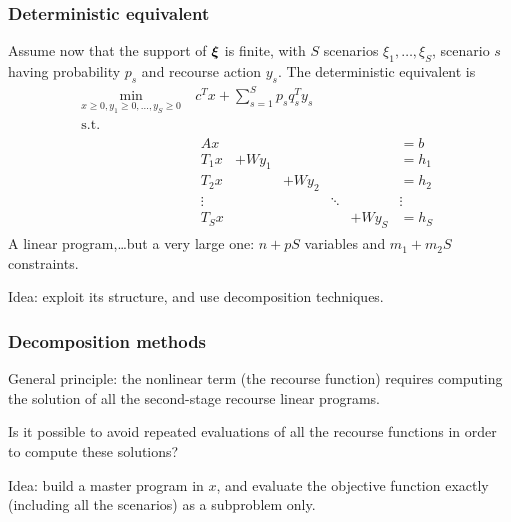 \documentclass[aspectratio=169]{beamer}
\begin{document}
\begin{frame}
\frametitle{Deterministic equivalent}

Assume now that the support of ${\boldsymbol{\xi}}$ is finite, with $S$ scenarios $\xi_1, \ldots, \xi_S$, scenario $s$ having probability $p_s$ and recourse action $y_s$.
The deterministic equivalent is
\vspace*{-2mm}
\begin{align*}
\min_{x \geq 0, y_1 \geq 0, \ldots, y_S \geq 0}\ & c^T x + \sum_{s=1}^S p_s q_s^T y_s \\
\text{s.t. } & \\
& \begin{matrix} Ax & & & & & = b\\
T_1 x & + W y_1 & & & & = h_1 \\
T_2 x & & + W y_2 & & & = h_2 \\
\vdots & & & \ddots & & \vdots \\
T_S x & & & & + W y_S & = h_S
\end{matrix}
\end{align*}
A linear program,\ldots but a very large one: $n+pS$ variables and $m_1+m_2S$ constraints.

{\red Idea}: exploit its structure, and use decomposition techniques.

\end{frame}

\begin{frame}
\frametitle{Decomposition methods}

{\red General principle}: the nonlinear term (the recourse function) requires computing the solution of all the second-stage recourse linear programs.

\mbox{}

Is it possible to avoid repeated evaluations of all the recourse functions in order to compute these solutions?

\mbox{}

{\red Idea}: build a master program in $x$, and evaluate the objective function exactly (including all the scenarios) as a subproblem only.

\end{frame}
\end{document}
